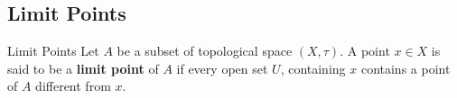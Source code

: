 \subsection{Limit Points}\label{sub:Limit Points} %

\begin{definition}{Limit Points}{}
    Let $A$ be a subset of topological space $(X,\tau)$. A point $x
    \in X$ is said to be a \textbf{limit point} of $A$ if
    every open set $U$, containing $x$ contains a point of $A$
    different from $x$.
\end{definition}

